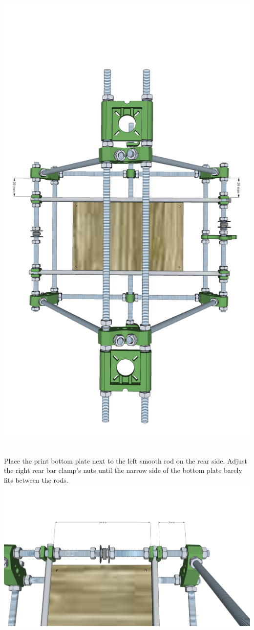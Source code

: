 \documentclass[twoside,openany,a4paper,titlepage]{memoir}
\begin{document}
	\includegraphics[width=1\linewidth]{graphics/ch6_7_2.png}
	
	\section{}
	Place the print bottom plate next to the left smooth rod on the rear side. Adjust the right rear bar clamp's
	nuts until the narrow side of the bottom plate barely fits between the rods.\\
	\includegraphics[width=1\linewidth]{graphics/ch6_8.png}
	
\end{document}
